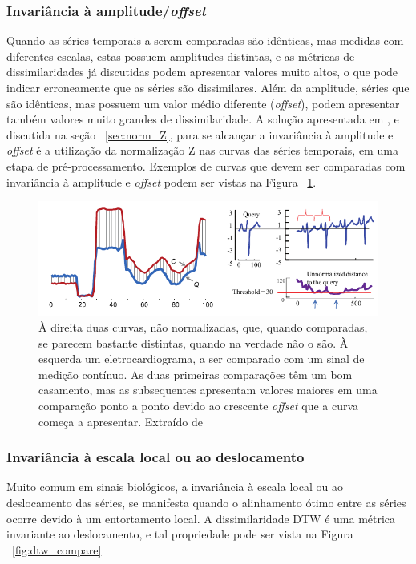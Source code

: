 \subsubsection{Invariância à amplitude/\emph{offset}}

Quando as séries temporais a serem comparadas são idênticas, mas medidas com diferentes escalas, estas possuem amplitudes distintas, e as métricas de dissimilaridades já discutidas podem apresentar valores muito altos, o que pode indicar erroneamente que as séries são dissimilares. Além da amplitude, séries que são idênticas, mas possuem um valor médio diferente (\emph{offset}), podem apresentar também valores muito grandes de dissimilaridade. A solução apresentada em \parencite{CID}, e discutida na seção ~\ref{sec:norm_Z}, para se alcançar a invariância à amplitude e \emph{offset} é a utilização da normalização Z nas curvas das séries temporais, em uma etapa de pré-processamento. Exemplos de curvas que devem ser comparadas com invariância à amplitude e \emph{offset} podem ser vistas na Figura ~\ref{fig:inv_offset_amplitude}.

\begin{figure}[h!]
	\includegraphics[width=\linewidth]{figuras/invariancias/amplitude_offset.png}
	\caption{À direita duas curvas, não normalizadas, que, quando comparadas, se parecem bastante distintas, quando na verdade não o são. À esquerda um eletrocardiograma, a ser comparado com um sinal de medição contínuo. As duas primeiras comparações têm um bom casamento, mas as subsequentes apresentam valores maiores em uma comparação ponto a ponto devido ao crescente \emph{offset} que a curva começa a apresentar. Extraído de ~\parencite{CID}}
	\label{fig:inv_offset_amplitude}
\end{figure}

\subsubsection{Invariância à escala local ou ao deslocamento}

Muito comum em sinais biológicos, a invariância à escala local ou ao deslocamento das séries, se manifesta quando o alinhamento ótimo entre as séries ocorre devido à um entortamento local. A dissimilaridade DTW é uma métrica invariante ao deslocamento, e tal propriedade pode ser vista na Figura ~\ref{fig:dtw_compare}

